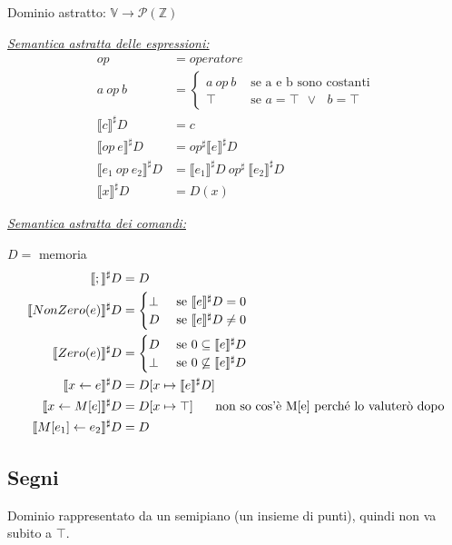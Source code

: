 \documentclass[a4paper, 10pt]{book}
\begin{document}
Dominio astratto: $\mathbb{V}\rightarrow \mathcal{P}(\mathbb{Z})$
\newline

\noindent
\underline{\textit{Semantica astratta delle espressioni:}}
\begin{align*}
	op &= operatore\\
	a ~op~ b &=
	\begin{cases}
		a ~op~ b &\text{ se a e b sono costanti}\\
		\top &\text{ se $a=\top$ $\lor~$ $b=\top$}
	\end{cases}\\
	\llbracket c \rrbracket^\sharp D &= c\\
	\llbracket op~e \rrbracket^\sharp D &= op^\sharp\llbracket e\rrbracket^\sharp D\\
	\llbracket e_1~op~e_2 \rrbracket^\sharp D &= \llbracket e_1\rrbracket^\sharp D ~op^\sharp~\llbracket e_2\rrbracket^\sharp D\\
	\llbracket x\rrbracket^\sharp D &= D(x)
\end{align*}

\underline{\textit{Semantica astratta dei comandi:}}

$D =$ memoria
\begin{align*}
	\llbracket ; \rrbracket^\sharp D &= D\\
	\llbracket NonZero(e) \rrbracket^\sharp D &=
	\begin{cases}
		\bot &\text{ se } \llbracket e\rrbracket^\sharp D = 0 \\
		D &\text{ se } \llbracket e\rrbracket^\sharp D \neq 0
	\end{cases}\\
	\llbracket Zero(e) \rrbracket^\sharp D &=
	\begin{cases}
		D &\text{ se } 0\subseteq \llbracket e\rrbracket^\sharp D \\
		\bot &\text{ se } 0\not\subseteq \llbracket e\rrbracket^\sharp D
	\end{cases}\\
	\llbracket x\leftarrow e \rrbracket^\sharp D &= D[x\mapsto \llbracket e\rrbracket^\sharp D]\\
	\llbracket x\leftarrow M[e] \rrbracket^\sharp D &= D[x\mapsto \top] \text{\hspace{0.5cm} non so cos'è M[e] perché lo valuterò dopo}\\
	\llbracket M[e_1]\leftarrow e_2 \rrbracket^\sharp D &= D
\end{align*}

\subsection{Segni}
Dominio rappresentato da un semipiano (un insieme di punti), quindi non va subito a $\top$.
\end{document}
